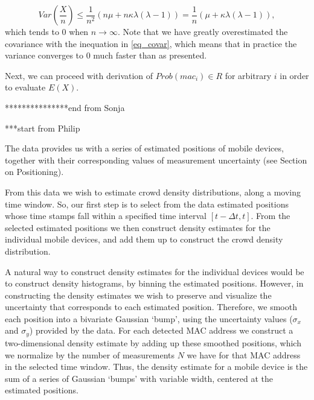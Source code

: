 \documentclass[10pt,a4paper]{article}
\begin{document}
\begin{equation}
Var(\frac{X}{n} ) \leq \frac{1}{n^2}(n \mu + n  \kappa \lambda(\lambda - 1)) = \frac{1}{n}(\mu +  \kappa \lambda(\lambda - 1)), 
\end{equation}
which tends to $0$ when $n \rightarrow \infty$. Note that we have greatly overestimated the covariance with the inequation in \eqref{eq_covar}, which means that in practice the variance converges to $0$ much faster than as presented. 

Next, we can proceed with derivation of $Prob(mac_i) \in R$ for arbitrary $i$ in order to evaluate $E(X)$. 
   

***************end from Sonja

***start from Philip

The data provides us with a series of estimated positions of mobile devices, together with their corresponding values of measurement uncertainty (see Section on Positioning).

From this data we wish to estimate crowd density distributions, along a moving time window.
So, our first step is to select from the data estimated positions whose time stamps fall within a specified time interval $[t-\Delta t,t]$.
From the selected estimated positions we then construct density estimates for the individual mobile devices, and add them up to construct the crowd density distribution.

A natural way to construct density estimates for the individual devices would be to construct density histograms, by binning the estimated positions.
However, in constructing the density estimates we wish to preserve and visualize the uncertainty that corresponds to each estimated position.
Therefore, we smooth each position into a bivariate Gaussian `bump', using the uncertainty values ($\sigma_{x}$ and $\sigma_{y}$) provided by the data.
For each detected MAC address we construct a two-dimensional density estimate by adding up these smoothed positions, which we normalize by the number of measurements $N$ we have for that MAC address in the selected time window.
Thus, the density estimate for a mobile device is the sum of a series of Gaussian `bumps' with variable width, centered at the estimated positions.
\end{document}
